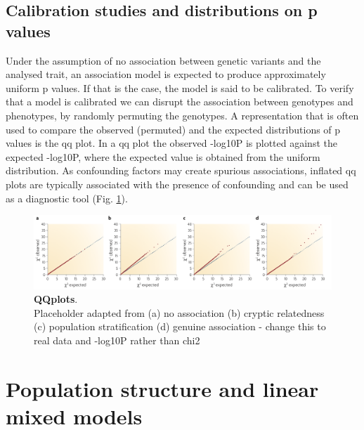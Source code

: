 \subsection{Calibration studies and distributions on p values}

Under the assumption of no association between genetic variants and the analysed trait, an association model is expected to produce approximately uniform p values.
If that is the case, the model is said to be calibrated.
To verify that a model is calibrated we can disrupt the association between genotypes and phenotypes, by randomly permuting the genotypes. 
A representation that is often used to compare the observed (permuted) and the expected distributions of p values is the \gls{qq} plot. 
In a \gls{qq} plot the observed -log10P is plotted against the expected -log10P, where the expected value is obtained from the uniform distribution. 
As confounding factors may create spurious associations, inflated \gls{qq} plots are typically associated with the presence of confounding and can be used as a diagnostic tool (Fig. \ref{fig:qqplots}). 

\begin{figure}[h]
\centering
\includegraphics[width=15cm]{Chapter2/Fig/qqplots.png}
\caption[\textbf{QQplots}]{\textbf{QQplots}.\\
Placeholder adapted from \cite{mccarthy2008genome}
(a) no association (b) cryptic relatedness (c) population stratification (d) genuine association - change this to real data and -log10P rather than chi2}
\label{fig:qqplots}
\end{figure}



\section{Population structure and linear mixed models}


